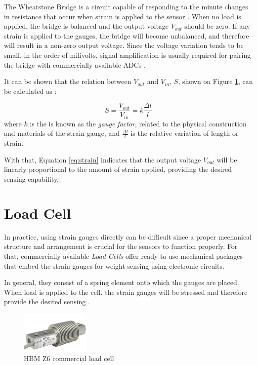 \documentclass[openright]{normas-utf-tex} %
\begin{document}
The Wheatstone Bridge is a circuit capable of responding to the minute changes
in resistance that occur when strain is applied to the sensor \cite{Michigan2020}.
When no load is applied, the bridge is balanced and the output voltage
$V_{out}$ should be zero. If any strain is applied to the gauges, the bridge
will become unbalanced, and therefore will result in a non-zero output voltage.
Since the voltage variation tends to be small, in the order of milivolts, signal amplification is usually
required for pairing the bridge with commercially available ADCs \cite{HorowitzHill2015}.

It can be shown that the relation between $V_{out}$ and $V_{in}$, $S$, shown on Figure \ref{fig:gauge2}, can be
calculated as \cite{Stefanescu}:

\begin{equation}
    \label{eq:strain}
    S = \frac{V_{out}}{V_{in}} = k\frac{\Delta l}{l}
\end{equation}
where $k$ is the is known as the \textit{gauge factor}, related to the physical construction and materials of the strain gauge, and 
$\frac{\Delta l}{l}$ is the relative variation of length or strain.

With that, Equation \ref{eq:strain} indicates that the output voltage $V_{out}$ will be linearly proportional to the
amount of strain applied, providing the desired sensing capability.

\section{Load Cell}

In practice, using strain gauges directly can be difficult since a proper
mechanical structure and arrangement is crucial for the sensors to function
properly. For that, commercially available \textit{Load Cells} offer ready to
use mechanical packages that embed the strain gauges for weight sensing
using electronic circuits.

In general, they consist of a spring element onto which the gauges are placed.
When load is applied to the cell, the strain gauges will be stressed and
therefore provide the desired sensing \cite{HBM2022}.

\begin{figure}[H]
	\centering
	\includegraphics[width=0.3\textwidth]{./images/hbmz6.png}
	\caption[HBM Z6 commercial load cell]{HBM Z6 commercial load cell}
	\label{fig:gauge2}
\end{figure}
\end{document}
